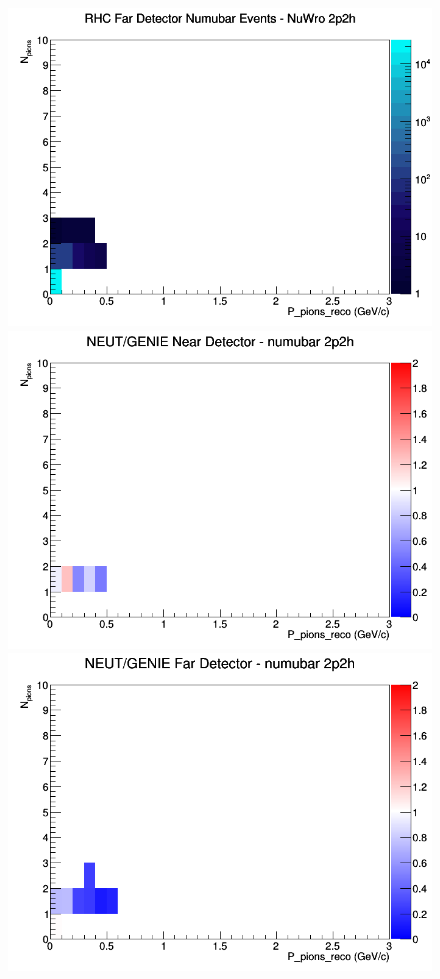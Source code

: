 \documentclass[12pt]{article}
\begin{document}
\begin{figure}[h]
\endminipage
{}
\includegraphics[width=\linewidth]{eff_N_P/GAr/pions/2p2h_RHC_FD_numubar_N_P_NuWro.png}
\endminipage
\newline
{}
\includegraphics[width=\linewidth]{eff_N_P/GAr/pions/ratios/2p2h_NEUT_GENIE_numubar_near_N_P.png}
\endminipage
{}
\includegraphics[width=\linewidth]{eff_N_P/GAr/pions/ratios/2p2h_NEUT_GENIE_numubar_far_N_P.png}

\end{figure}
\end{document}
